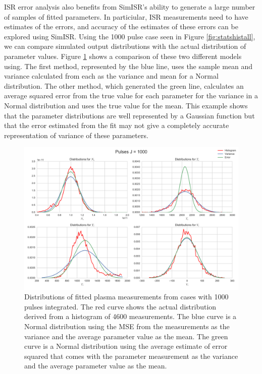 ISR error analysis also benefits from SimISR's ability to generate a large number of samples of fitted parameters. In particiular, ISR measurements need to have estimates of the errors, and accuracy of the estimates of these errors can be explored using SimISR. Using the 1000 pulse case seen in Figure \ref{fig:statshistall}, we can compare simulated output distributions with the actual distribution of parameter values. Figure \ref{fig:statshistsingle} shows a comparison of these two different models using. The first method, represented by the blue line, uses the sample mean and variance calculated from each as the variance and mean for a Normal distribution. The other method, which generated the green line, calculates an average squared error from the true value for each parameter for the variance in a Normal distribution and uses the true value for the mean. 
This example shows that the parameter distributions are well represented by a Gaussian function but that the error estimated from the fit may not give a completely accurate representation of variance of these parameters. 

\begin{figure}[!t]
\centering
\includegraphics[width=5in]{histsingle}
\caption{Distributions of fitted plasma measurements from cases with 1000 pulses integrated. The red curve shows the actual distribution derived from a histogram of 4600 measurements. The blue curve is a Normal distribution using the MSE from the measurements as the variance and the average parameter value as the mean.  The green curve is a Normal distribution using the average estimate of error squared that comes with the parameter measurement as the variance and the average parameter value as the mean.}
\label{fig:statshistsingle}
\end{figure}


